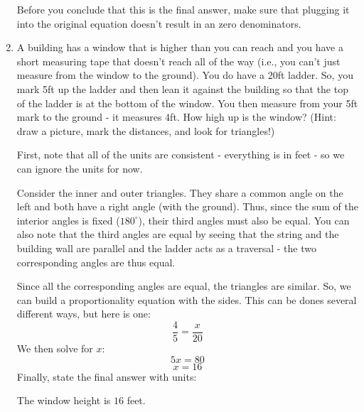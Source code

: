 \documentclass[letterpaper,12pt,fleqn]{article}
\begin{document}
\begin{enumerate}
  Before you conclude that this is the final answer, make sure that plugging it into the
  original equation doesn't result in an zero denominators.

\item A building has a window that is higher than you can reach and you have a
  short measuring tape that doesn't reach all of the way (i.e., you can't just
  measure from the window to the ground). You do have a 20ft ladder. So, you
  mark 5ft up the ladder and then lean it against the building so that the top
  of the ladder is at the bottom of the window. You then measure from your 5ft
  mark to the ground - it measures 4ft. How high up is the window? (Hint: draw
  a picture, mark the distances, and look for triangles!)

  First, note that all of the units are consistent - everything is in feet - so we can
  ignore the units for now.

  \begin{minipage}{3in}
  \end{minipage}
  \begin{minipage}{3in}
    Consider the inner and outer triangles. They share a common angle on the left and
    both have a right angle (with the ground). Thus, since the sum of the interior angles
    is fixed ($180^{\circ}$), their third angles must also be equal. You can also note
    that the third angles are equal by seeing that the string and the building wall are
    parallel and the ladder acts as a traversal - the two corresponding angles are thus
    equal.
  \end{minipage}

  Since all the corresponding angles are equal, the triangles are similar. So, we can
  build a proportionality equation with the sides. This can be dones several different
  ways, but here is one:
  \[\frac{4}{5}=\frac{x}{20}\]
  We then solve for $x$:
  \[5x=80\]
  \[x=16\]
  Finally, state the final answer with units:

  The window height is $16$ feet.
\end{enumerate}
\end{document}
